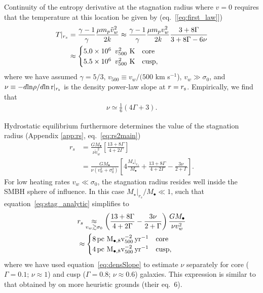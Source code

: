 \documentclass[usenatbib,fleqn]{mn2e}
\newcommand{\rs}{r_s}
\newcommand{\vw}{\tilde{v}_{w}}
\newcommand{\pc}{\rm pc}
\newcommand{\Mstar}{M_{\star}}
\newcommand{\Mbh}[1][]{M_{\bullet#1}}
\newcommand{\Mbheight}{M_{\bullet,8}}
\newcommand{\pyear}{{\rm yr}^{-1}}
\newcommand{\densSlope}{\nu}
\begin{document}
Continuity of the entropy derivative at the stagnation radius where $v = 0$ requires that the temperature at this location be given by (eq.~[\ref{eq:first_law}])
\begin{align}
T|_{r_{s}}& = \frac{\gamma-1}{\gamma}\frac{\mu m_p
  \tilde{v}_{w}^{2}}{2k} \approx \frac{\gamma-1}{\gamma}\frac{\mu
  m_p v_w^2}{2k} \frac{3+8\Gamma}{3+8\Gamma-6\nu} \nonumber\\ 
 &\approx
 \begin{cases}
  5.0\times 10^6\ \, v_{500}^2 \,\,{\rm K} & \text{core} \\
  5.5\times 10^6\ \, v_{500}^2 \,\,{\rm K} & \text{cusp},
 \end{cases}
\label{eq:Tanalytic}
\end{align}
where we have assumed $\gamma=5/3$, $v_{500} \equiv v_{w}/(500$ km
s$^{-1}$), $v_w\gg\sigma_0$,  and $\densSlope \equiv -d{\rm ln}\rho/d{\rm ln\,r}|_{r_{\rm
    s}}$ is the density power-law slope at $r = r_{\rm s}$.
Empirically, we find that
\begin{align}
\densSlope \simeq \frac{1}{6} \left(4 \Gamma+3\right).
\label{eq:densSlope}
\end{align}

Hydrostatic equilibrium furthermore determines the value of the stagnation radius (Appendix \ref{app:rs}, eq.~\ref{eq:rs2main})
\begin{align}
  \rs&=\frac{G \Mbh}{\densSlope \vw^2}\left[\frac{13+ 8\Gamma}{4+2\Gamma}\right]\nonumber\\
  &=\frac{G \Mbh}{\densSlope (v_w^{2}+\sigma_0^2)}\left[4
    \frac{\Mstar|_{\rs}}{\Mbh} +\frac{13+
      8\Gamma}{4+2\Gamma}- \frac{3\nu}{2+\Gamma}\right]. 
\label{eq:stag_analytic}
\end{align}
For low heating rates $v_w \ll \sigma_0$, the stagnation radius resides well inside the SMBH sphere of influence.  In this case $\Mstar|_{\rs}/\Mbh \ll1$, such that equation~\eqref{eq:stag_analytic} simplifies to
\begin{align}
  &\rs \underset{v_w \gtrsim \sigma_0}\approx
  \left(\frac{13+8\Gamma}{4+2\Gamma}-
    \frac{3\nu}{2+\Gamma}\right)\frac{G \Mbh}{\nu v_w^2}\nonumber\\
  &\approx \begin{cases} 8
    \, \pc \,\, \Mbheight v_{500}^{-2}\, \pyear& \text{core} \\
    4 \, \pc \,\, \Mbheight v_{500}^{-2} \, \pyear & \text{cusp},
  \end{cases}
  \label{eq:stag_simple}
\end{align}
where we have used equation~\eqref{eq:densSlope} to estimate
$\densSlope$ separately for
core ($\Gamma = 0.1$; $\densSlope\approx 1$) and cusp ($\Gamma = 0.8$; $\densSlope \approx 0.6$) galaxies.  This
expression is similar to that obtained by \citet{Volonteri+11} on more
heuristic grounds (their eq.~6). 
\end{document}
